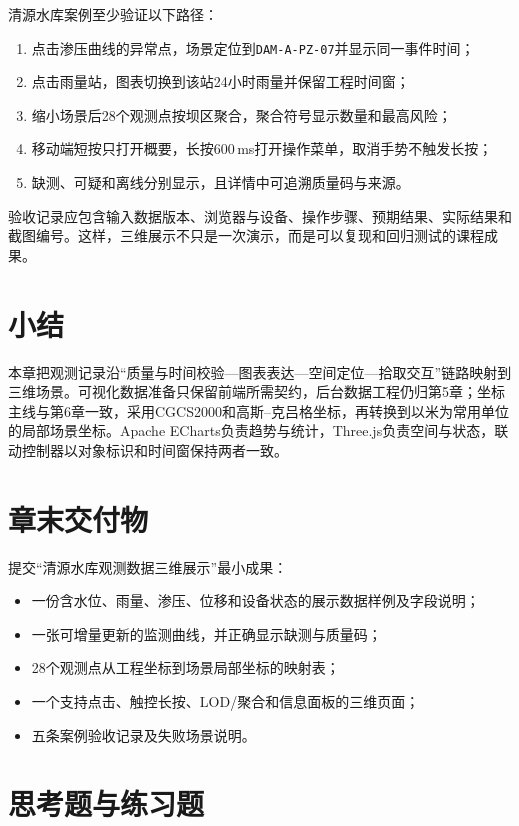 清源水库案例至少验证以下路径：

\begin{enumerate}
\item 点击渗压曲线的异常点，场景定位到\texttt{DAM-A-PZ-07}并显示同一事件时间；
\item 点击雨量站，图表切换到该站24小时雨量并保留工程时间窗；
\item 缩小场景后28个观测点按坝区聚合，聚合符号显示数量和最高风险；
\item 移动端短按只打开概要，长按600\,ms打开操作菜单，取消手势不触发长按；
\item 缺测、可疑和离线分别显示，且详情中可追溯质量码与来源。
\end{enumerate}

验收记录应包含输入数据版本、浏览器与设备、操作步骤、预期结果、实际结果和截图编号。这样，三维展示不只是一次演示，而是可以复现和回归测试的课程成果。

\section*{小结}

本章把观测记录沿“质量与时间校验—图表表达—空间定位—拾取交互”链路映射到三维场景。可视化数据准备只保留前端所需契约，后台数据工程仍归第5章；坐标主线与第6章一致，采用CGCS2000和高斯--克吕格坐标，再转换到以米为常用单位的局部场景坐标。Apache ECharts负责趋势与统计，Three.js负责空间与状态，联动控制器以对象标识和时间窗保持两者一致。

\section*{章末交付物}

提交“清源水库观测数据三维展示”最小成果：

\begin{itemize}
\item 一份含水位、雨量、渗压、位移和设备状态的展示数据样例及字段说明；
\item 一张可增量更新的监测曲线，并正确显示缺测与质量码；
\item 28个观测点从工程坐标到场景局部坐标的映射表；
\item 一个支持点击、触控长按、LOD/聚合和信息面板的三维页面；
\item 五条案例验收记录及失败场景说明。
\end{itemize}

\section*{思考题与练习题}

